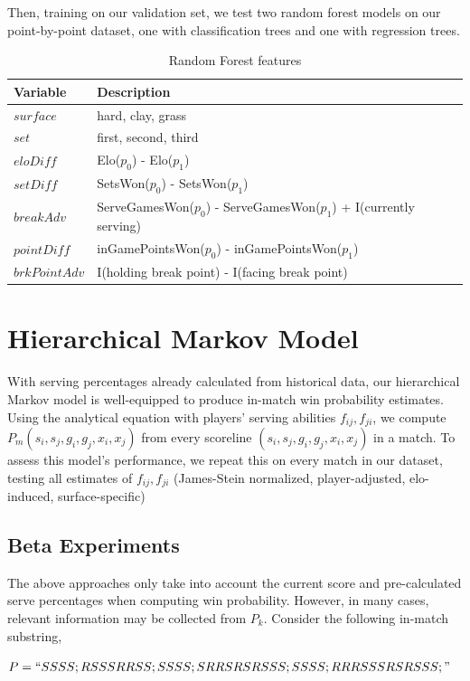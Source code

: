 \documentclass[chapterprefix=false]{report}
\begin{document}
Then, training on our validation set, we test two random forest models on our point-by-point dataset, one with classification trees and one with regression trees.

\begin{table}[H]
\centering
\caption{Random Forest features}
\label{my-label}
\begin{tabular}{ll}
 \hline
 Variable & Description \\
 \hline
 $surface$ & hard, clay, grass \\
 \hline
 $set$ &  first, second, third \\
 \hline
 $eloDiff$ &  Elo($p_0$) - Elo($p_1$) \\
 \hline
 $setDiff$ &  SetsWon($p_0$) - SetsWon($p_1$)\\
 \hline
 $breakAdv$ &  ServeGamesWon($p_0$) - ServeGamesWon($p_1$) + I(currently serving)\\
 \hline
 $pointDiff$ &  inGamePointsWon($p_0$) - inGamePointsWon($p_1$)\\
 \hline
 $brkPointAdv$ & I(holding break point) - I(facing break point)\\
 \hline
\end{tabular}
\end{table}

\section{Hierarchical Markov Model}
With serving percentages already calculated from historical data, our hierarchical Markov model is well-equipped to produce in-match win probability estimates. Using the analytical equation with players' serving abilities $f_{ij},f_{ji}$, we compute $P_m(s_i,s_j,g_i,g_j,x_i,x_j)$ from every scoreline $(s_i,s_j,g_i,g_j,x_i,x_j)$ in a match. To assess this model's performance, we repeat this on every match in our dataset, testing all estimates of $f_{ij},f_{ji}$ (James-Stein normalized, player-adjusted, elo-induced, surface-specific)

\subsection{Beta Experiments}
The above approaches only take into account the current score and pre-calculated serve percentages when computing win probability. However, in many cases, relevant information may be collected from $P_k$. Consider the following in-match substring, 

$P=``SSSS;RSSSRRSS;SSSS;SRRSRSRSSS;SSSS;RRRSSSRSRSSS;"$
\end{document}

